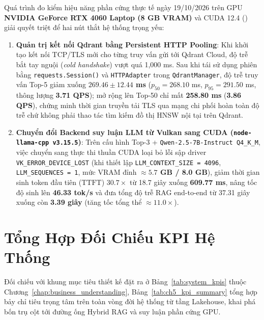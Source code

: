 Quá trình đo kiểm hiệu năng phần cứng thực tế ngày 19/10/2026 trên GPU \textbf{NVIDIA GeForce RTX 4060 Laptop (8 GB VRAM)} và CUDA 12.4 () giải quyết triệt để hai nút thắt hệ thống trọng yếu:

\begin{enumerate}[label=\textbf{\arabic*.}]
  \item \textbf{Quản trị kết nối Qdrant bằng Persistent HTTP Pooling}: Khi khởi tạo kết nối TCP/TLS mới cho từng truy vấn gửi tới Qdrant Cloud, độ trễ bắt tay nguội (\textit{cold handshake}) vượt quá 1,000 ms. Sau khi tái sử dụng phiên bằng \texttt{requests.Session()} và \texttt{HTTPAdapter} trong \texttt{QdrantManager}, độ trễ truy vấn Top-5 giảm xuống \textbf{$269.46 \pm 12.44$ ms} ($p_{50} = 268.10$ ms, $p_{95} = 291.50$ ms, thông lượng \textbf{3.71 QPS}); mở rộng lên Top-50 chỉ mất \textbf{258.80 ms} (\textbf{3.86 QPS}), chứng minh thời gian truyền tải TLS qua mạng chi phối hoàn toàn độ trễ chứ không phải thao tác tìm kiếm đồ thị HNSW nội tại trên Qdrant.
  \item \textbf{Chuyển đổi Backend suy luận LLM từ Vulkan sang CUDA (\texttt{node-llama-cpp v3.15.5})}: Trên cấu hình Top-3 + \texttt{Qwen-2.5-7B-Instruct Q4\_K\_M}, việc chuyển sang thực thi thuần CUDA loại bỏ lỗi sập driver \texttt{VK\_ERROR\_DEVICE\_LOST} (khi thiết lập \texttt{LLM\_CONTEXT\_SIZE = 4096}, \texttt{LLM\_SEQUENCES = 1}, mức VRAM đỉnh \textbf{$\approx 5.7$ GB / 8.0 GB}), giảm thời gian sinh token đầu tiên ($\mathrm{TTFT}$) \textbf{$30.7\times$} từ 18.7 giây xuống \textbf{609.77 ms}, nâng tốc độ sinh lên \textbf{46.33 tok/s} và đưa tổng độ trễ RAG end-to-end từ 37.31 giây xuống còn \textbf{3.39 giây} (tăng tốc tổng thể $\approx 11.0\times$).
\end{enumerate}



\section{Tổng Hợp Đối Chiếu KPI Hệ Thống}
\label{sec:ch5_kpi_synthesis}

Đối chiếu với khung mục tiêu thiết kế đặt ra ở Bảng~\ref{tab:system_kpis} thuộc Chương~\ref{chap:business_understanding}, Bảng~\ref{tab:ch5_kpi_summary} tổng hợp bảy chỉ tiêu trọng tâm trên toàn vòng đời hệ thống từ tầng Lakehouse, khai phá bốn trụ cột tới đường ống Hybrid RAG và suy luận phần cứng GPU.

